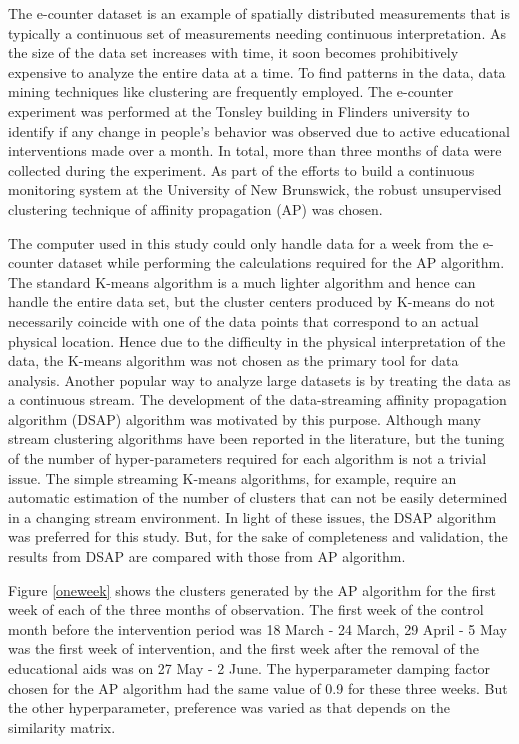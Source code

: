 The e-counter dataset is an example of spatially distributed measurements that is typically a continuous set of measurements needing continuous interpretation. As the size of the data set increases with time, it soon becomes prohibitively expensive to analyze the entire data at a time. To find patterns in the data, data mining techniques like clustering are frequently employed. The e-counter experiment was performed at the Tonsley building in Flinders university to identify if any change in people's behavior was observed due to active educational interventions made over a month. In total, more than three months of data were collected during the experiment. As part of the efforts to build a continuous monitoring system at the University of New Brunswick, the robust unsupervised clustering technique of affinity propagation (AP) was chosen.

The computer used in this study could only handle data for a week from the e-counter dataset while performing the calculations required for the AP algorithm. The standard K-means algorithm is a much lighter algorithm and hence can handle the entire data set, but the cluster centers produced by K-means do not necessarily coincide with one of the data points that correspond to an actual physical location. Hence due to the difficulty in the physical interpretation of the data, the K-means algorithm was not chosen as the primary tool for data analysis. Another popular way to analyze large datasets is by treating the data as a continuous stream. The development of the data-streaming affinity propagation algorithm (DSAP) algorithm was motivated by this purpose. Although many stream clustering algorithms have been reported in the literature, but the tuning of the number of hyper-parameters required for each algorithm is not a trivial issue. The simple streaming K-means algorithms, for example, require an automatic estimation of the number of clusters that can not be easily determined in a changing stream environment. In light of these issues, the DSAP algorithm was preferred for this study. But, for the sake of completeness and validation, the results from DSAP are compared with those from AP algorithm.   
    
Figure \ref{oneweek} shows the clusters generated by the AP algorithm for the first week of each of the three months of observation. The first week of the control month before the intervention period was 18 March - 24 March, 29 April - 5 May was the first week of intervention, and the first week after the removal of the educational aids was on 27 May - 2 June. The hyperparameter damping factor chosen for the AP algorithm had the same value of 0.9 for these three weeks. But the other hyperparameter, preference was varied as that depends on the similarity matrix.

